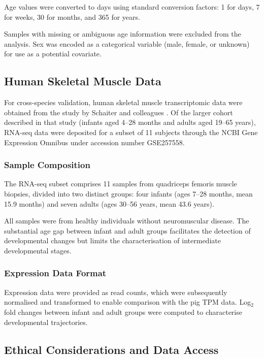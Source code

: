 Age values were converted to days using standard conversion factors: 1 for days, 7 for weeks, 30 for months, and 365 for years.

Samples with missing or ambiguous age information were excluded from the analysis. Sex was encoded as a categorical variable (male, female, or unknown) for use as a potential covariate.

\subsection{Human Skeletal Muscle Data}

For cross-species validation, human skeletal muscle transcriptomic data were obtained from the study by Schaiter and colleagues \parencite{schaiter_molecular_2024}. Of the larger cohort described in that study (infants aged 4--28 months and adults aged 19--65 years), RNA-seq data were deposited for a subset of 11 subjects through the NCBI Gene Expression Omnibus under accession number GSE257558.

\subsubsection{Sample Composition}

The RNA-seq subset comprises 11 samples from quadriceps femoris muscle biopsies, divided into two distinct groups: four infants (ages 7--28 months, mean 15.9 months) and seven adults (ages 30--56 years, mean 43.6 years).

All samples were from healthy individuals without neuromuscular disease. The substantial age gap between infant and adult groups facilitates the detection of developmental changes but limits the characterisation of intermediate developmental stages.

\subsubsection{Expression Data Format}

Expression data were provided as read counts, which were subsequently normalised and transformed to enable comparison with the pig TPM data. Log$_2$ fold changes between infant and adult groups were computed to characterise developmental trajectories.

\subsection{Ethical Considerations and Data Access}

